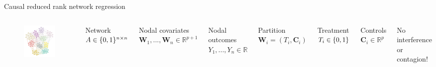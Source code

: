 \documentclass{beamer}
\theoremstyle{remark}
\newcommand{\C}{\bm C}
\newcommand{\W}{\bm W}
\newcommand \R {\mathbb{R}}
\DeclarePairedDelimiter{\set}{\{}{\}}
\begin{document}
\begin{frame}{Causal reduced rank network regression}
    \begin{columns}

        \begin{figure}
            \includegraphics[width=\textwidth]{figures/assortative.png}
        \end{figure}


        Network $A \in \set{0, 1}^{n \times n}$

        Nodal covariates $\W_1, ..., \W_n \in \R^{p + 1}$

        Nodal outcomes $Y_1, ..., Y_n \in \R$

        \vspace{6mm}

        Partition $\W_i = (T_i, \C_i)$

        Treatment $T_i \in \set{0, 1}$

        Controls $\C_i \in \R^p$

        \vspace{6mm}

        No interference or contagion!
    \end{columns}
\end{frame}
\end{document}
